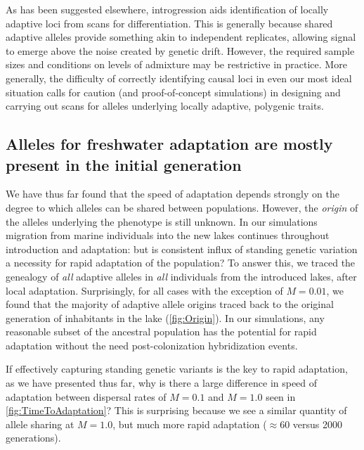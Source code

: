 \documentclass{article}
\newcommand{\plr}[1]{\todo[linecolor=blue,backgroundcolor=blue!25,bordercolor=blue]{#1}}
\begin{document}
As has been suggested elsewhere, introgression aids identification of locally adaptive loci from scans for differentiation.
This is generally because shared adaptive alleles provide something akin to independent replicates,
allowing signal to emerge above the noise created by genetic drift.
However, the required sample sizes and conditions on levels of admixture may be restrictive in practice.
More generally, the difficulty of correctly identifying causal loci in even our most ideal situation
calls for caution (and proof-of-concept simulations) in designing and carrying out scans for alleles underlying locally adaptive, polygenic traits.

\subsection*{Alleles for freshwater adaptation are mostly present in the initial generation}

We have thus far found that the speed of adaptation depends strongly on the degree to which alleles can be shared between populations. 
However, the \textit{origin} of the alleles underlying the phenotype is still unknown. 
In our simulations migration from marine individuals into the new lakes continues throughout introduction and adaptation: but is consistent influx of standing genetic variation a necessity for rapid adaptation of the population?
To answer this, we traced the genealogy of \textit{all} adaptive alleles in \textit{all} individuals from the introduced lakes, after local adaptation.
Surprisingly, for all cases with the exception of $M = 0.01$, we found that the majority of adaptive allele origins traced back to the original generation of inhabitants in the lake (\autoref{fig:Origin}). 
In our simulations,
any reasonable subset of the ancestral population has the potential for rapid adaptation without the need post-colonization hybridization events.

If effectively capturing standing genetic variants is the key to rapid adaptation, as we have presented thus far, why is there a large difference in speed of adaptation between dispersal rates of $M = 0.1$ and $M = 1.0$ seen in \autoref{fig:TimeToAdaptation}?
This is surprising because we see a similar quantity of allele sharing at  $M = 1.0$, but much more rapid adaptation ($\approx 60$ versus 2000 generations).
\end{document}

